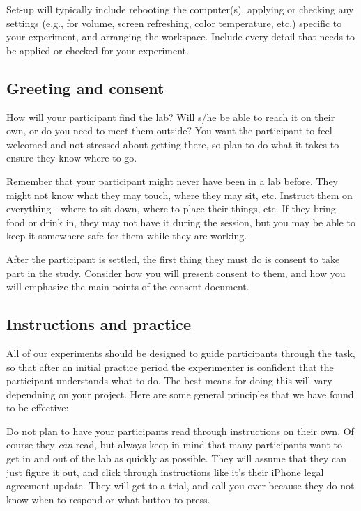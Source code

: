 \documentclass[
  12pt,
]{book}
\begin{document}
Set-up will typically include rebooting the computer(s), applying or checking any settings (e.g., for volume, screen refreshing, color temperature, etc.) specific to your experiment, and arranging the workspace. Include every detail that needs to be applied or checked for your experiment.

\subsection{Greeting and consent}\label{greeting-and-consent}

How will your participant find the lab? Will s/he be able to reach it on their own, or do you need to meet them outside? You want the participant to feel welcomed and not stressed about getting there, so plan to do what it takes to ensure they know where to go.

Remember that your participant might never have been in a lab before. They might not know what they may touch, where they may sit, etc. Instruct them on everything - where to sit down, where to place their things, etc. If they bring food or drink in, they may not have it during the session, but you may be able to keep it somewhere safe for them while they are working.

After the participant is settled, the first thing they must do is consent to take part in the study. Consider how you will present consent to them, and how you will emphasize the main points of the consent document.

\subsection{Instructions and practice}\label{instructions-and-practice}

All of our experiments should be designed to guide participants through the task, so that after an initial practice period the experimenter is confident that the participant understands what to do. The best means for doing this will vary dependning on your project. Here are some general principles that we have found to be effective:

Do not plan to have your participants read through instructions on their own. Of course they \emph{can} read, but always keep in mind that many participants want to get in and out of the lab as quickly as possible. They will assume that they can just figure it out, and click through instructions like it's their iPhone legal agreement update. They will get to a trial, and call you over because they do not know when to respond or what button to press.
\end{document}
